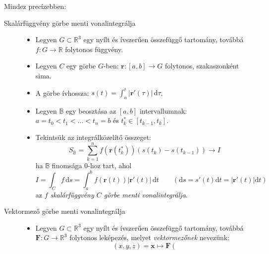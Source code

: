 \documentclass[DIV=15,appendixprefix]{scrreprt}
\theoremstyle{definition}
\theoremstyle{remark}
\begin{document}
Mindez precízebben:
\begin{description}
	\item[Skalárfüggvény görbe menti vonalintegrálja]\leavevmode
		\begin{itemize}
			\item Legyen $ G \subset \mathbb{ R }^{ 3 } $ egy nyílt és ívszerűen összefüggő
			tartomány, továbbá $ f \colon  G \rightarrow \mathbb{R} $ folytonos függvény.
			\item Legyen $ C $ egy görbe $ G $-ben: $ \mathbf{r} \colon \left[ a,{} b \right]
				\rightarrow G $ folytonos, szakaszonként sima.
			\item A görbe ívhossza: $ s \left( t \right) = \int_{ a }^{ t } \left| \mathbf{ r }'
				\left( \tau \right) \right| \, \mathrm{ d } \tau $.
			\item Legyen $ \mathbb{ B } $ egy beosztása az $ \left[ a,{} b \right] $ intervallumnak:
				$ a = t_{ 0 } < t_{ 1 } < \ldots < t_{ n } = b $ és $t_{ k }^{ * } \in \left[
				t_{ k - 1 },{} t_{ k } \right] $.
			\item Tekintsük az integrálközelítő összeget:
				\begin{equation*}
					S_{ \mathbb{ B } } = \sum_{ k = 1 }^{ n } f \left( \mathbf{ r } \left(
					t_{ k }^{ * } \right) \right) \left( s \left( t_{ k } \right) - s \left(
					t_{ k - 1 } \right) \right) \rightarrow I
				\end{equation*}
				ha $ \mathbb{ B } $ finomsága 0-hoz tart, ahol
				\begin{equation*}
					I = \int_{ C } f \, \mathrm{ d } s = \int_{ a }^{ b } f \left( \mathbf{ r }
					\left( t \right) \right) \left| \mathbf{ r }' \left( t \right) \right| \,
					\mathrm{ d } t \qquad \left( \mathrm{ d } s = s' \left( t \right) \mathrm{ d } t
					= \left| \mathbf{ r }' \left( t \right) \right| \mathrm{ d } t \right)
				\end{equation*}
				az \emph{$ f $ skalárfüggvény $ C $ görbe menti vonalintegrálja}.
		\end{itemize}
	\item[Vektormező görbe menti vonalintegrálja]\leavevmode
		\begin{itemize}
			\item Legyen $ G \subset \mathbb{ R }^{ 3 } $ egy nyílt és ívszerűen összefüggő
				tartomány, továbbá $ \mathbf{ F } \colon G \rightarrow \mathbb{ R }^{ 3 } $
				folytonos
				leképezés, melyet \emph{vektormezőnek} nevezünk:
				\begin{equation*}
					\left( x,{} y,{} z \right) = \mathbf{ x } \mapsto \mathbf{ F } \left(

\end{equation*}
\end{itemize}
\end{description}
\end{document}
